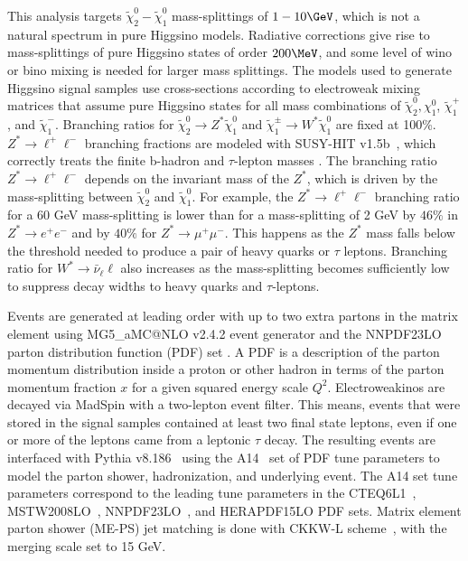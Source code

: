 This analysis targets $\tilde\chi_2^0-\tilde\chi_1^0$ mass-splittings of $1-10\GeV$, which is not a natural spectrum in pure Higgsino models.  Radiative corrections give rise to mass-splittings of pure Higgsino states of order $200\MeV$, and some level of wino or bino mixing is needed for larger mass splittings.  The models used to generate Higgsino signal samples use cross-sections according to electroweak mixing matrices that assume pure Higgsino states for all mass combinations of $\tilde\chi_2^0, \chi_1^0$, $\tilde\chi_1^+$, and $\tilde\chi_1^-$.  Branching ratios for $\tilde\chi_2^0 \rightarrow Z^*\tilde\chi_1^0$ and $\tilde\chi_1^\pm \rightarrow W^* \tilde\chi_1^0$ are fixed at 100\%.  $Z^*\rightarrow \ell^+\ell^-$ branching fractions are modeled with SUSY-HIT v1.5b~\cite{spira}, which correctly treats the finite b-hadron and $\tau$-lepton masses \cite{spira}.  
The branching ratio $Z^* \rightarrow \ell^+\ell^-$ depends on the invariant mass of the $Z^*$, which is driven by the mass-splitting between $\tilde\chi^0_2$ and $\tilde\chi^0_1$.  For example, the $Z^* \rightarrow \ell^+\ell^-$ branching ratio for a 60 GeV mass-splitting is lower than for a mass-splitting of 2 GeV by  $46\%$ in $Z^* \rightarrow e^+e^-$ and by $40\%$ for $Z^* \rightarrow \mu^+\mu^-$.  This happens as the $Z^*$ mass falls below the threshold needed to produce a pair of heavy quarks or $\tau$ leptons.  Branching ratio for $W^* \rightarrow \bar{\nu}_\ell \ell$ also increases as the mass-splitting becomes sufficiently low to suppress decay widths to heavy quarks and $\tau$-leptons. %

Events are generated at leading order with up to two extra partons in the matrix element using MG5\_aMC@NLO v2.4.2 event generator \cite{alwall} and the NNPDF23LO parton distribution function (PDF) set \cite{ball}.   A PDF is a description of the parton momentum distribution inside a proton or other hadron in terms of the parton momentum fraction $x$ for a given squared energy scale $Q^2$.   Electroweakinos are decayed via MadSpin \cite{1126-6708-2007-04-081, Artoisenet2013} with a two-lepton event filter.  This means, events that were stored in the signal samples contained at least two final state leptons, even if one or more of the leptons came from a leptonic $\tau$ decay.  The resulting events are interfaced with Pythia v8.186~\cite{pythia} using the A14~\cite{a14} set of PDF tune parameters to model the parton shower, hadronization, and underlying event.  The A14 set tune parameters correspond to the leading tune parameters in the CTEQ6L1~\cite{Pumplin:2002vw}, MSTW2008LO~\cite{Watt:2012tq}, NNPDF23LO~\cite{ball}, and HERAPDF15LO PDF sets.  Matrix element parton shower (ME-PS) jet matching is done with CKKW-L scheme~\cite{ckkwl}, with the merging scale set to 15 GeV.  

